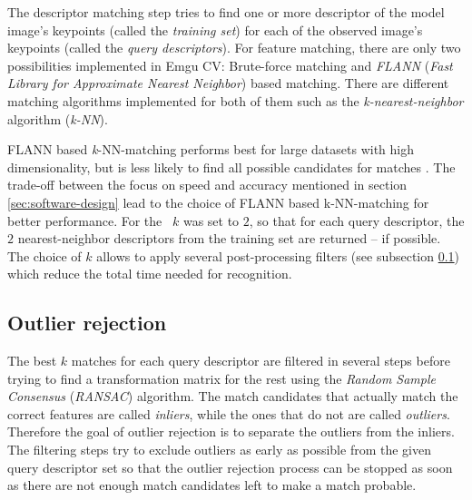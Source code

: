 The descriptor matching step tries to find one or more descriptor of the model image's keypoints (called the \emph{training set}) for each of the observed image's keypoints (called the \emph{query descriptors}). For feature matching, there are only two possibilities implemented in Emgu CV: Brute-force matching and \emph{FLANN} (\emph{Fast Library for Approximate Nearest Neighbor}) \cite{flann} based matching. There are different matching algorithms implemented for both of them such as the \emph{k-nearest-neighbor} algorithm (\emph{k-NN}).

FLANN based \emph{k}-NN-matching performs best for large datasets with high dimensionality, but is less likely to find all possible candidates for matches \cite{flann}. The trade-off between the focus on speed and accuracy mentioned in section \ref{sec:software-design} lead to the choice of FLANN based k-NN-matching for better performance. For the \vd~$k$ was set to $2$, so that for each query descriptor, the $2$ nearest-neighbor descriptors from the training set are returned -- if possible. The choice of $k$ allows to apply several post-processing filters (see subsection \ref{sec:tech-bg:subsec:outlier-rejection}) which reduce the total time needed for recognition.

\subsection{Outlier rejection}\label{sec:tech-bg:subsec:outlier-rejection}

The best $k$ matches for each query descriptor are filtered in several steps before trying to find a transformation matrix for the rest using the \emph{Random Sample Consensus} (\emph{RANSAC}) \cite{ransac} algorithm. The match candidates that actually match the correct features are called \emph{inliers}, while the ones that do not are called \emph{outliers}. Therefore the goal of outlier rejection is to separate the outliers from the inliers. The filtering steps try to exclude outliers as early as possible from the given query descriptor set so that the outlier rejection process can be stopped as soon as there are not enough match candidates left to make a match probable.

